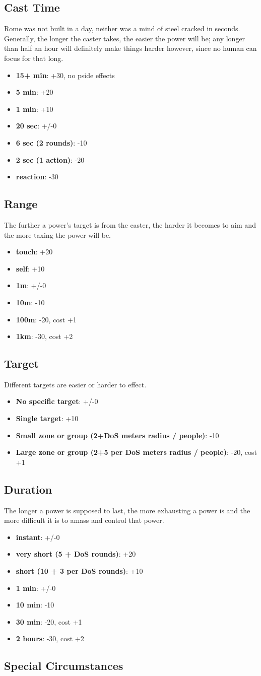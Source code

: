 \documentclass[12pt,a4paper,openany]{book}
\newcommand{\mod}[2]{\item \textbf{#1}: #2}
\begin{document}
	\subsection{Cast Time}
	Rome was not built in a day, neither was a mind of steel cracked in seconds. Generally, the longer the caster takes, the easier the power will be; any longer than half an hour will definitely make things harder however, since no human can focus for that long.
	\begin{itemize}
		\mod{15+ min}{+30, no pside effects}
		\mod{5 min}{+20}
		\mod{1 min}{+10}
		\mod{20 sec}{+/-0}
		\mod{6 sec (2 rounds)}{-10}
		\mod{2 sec (1 action)}{-20}
		\mod{reaction}{-30}
	\end{itemize}
	\subsection{Range}
	The further a power’s target is from the caster, the harder it becomes to aim and the more taxing the power will be.
	\begin{itemize}
		\mod{touch}{+20}
		\mod{self}{+10}
		\mod{1m}{+/-0}
		\mod{10m}{-10}
		\mod{100m}{-20, cost +1}
		\mod{1km}{-30, cost +2}
	\end{itemize}
	\subsection{Target}
	Different targets are easier or harder to effect.
	\begin{itemize}
		\mod{No specific target}{+/-0}
		\mod{Single target}{+10}
		\mod{Small zone or group (2+DoS meters radius / people)}{-10}
		\mod{Large zone or group (2+5 per DoS meters radius / people)}{-20, cost +1}
	\end{itemize}
	\subsection{Duration}
	The longer a power is supposed to last, the more exhausting a power is and the more difficult it is to amass and control that power.
	\begin{itemize}
		\mod{instant}{+/-0}
		\mod{very short (5 + DoS rounds)}{+20}
		\mod{short (10 + 3 per DoS rounds)}{+10}
		\mod{1 min}{+/-0}
		\mod{10 min}{-10}
		\mod{30 min}{-20, cost +1}
		\mod{2 hours}{-30, cost +2}
	\end{itemize}
	\subsection{Special Circumstances}
\end{document}

